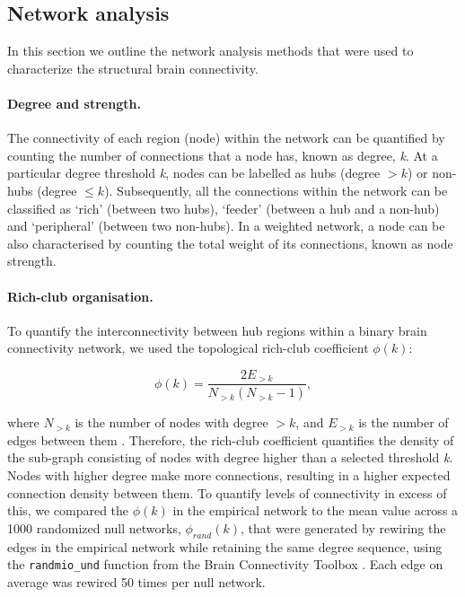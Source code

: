 \subsection{Network analysis}
In this section we outline the network analysis methods that were used to characterize the structural brain connectivity.

\paragraph*{Degree and strength.}

The connectivity of each region (node) within the network can be quantified by counting the number of connections that a node has, known as degree, \textit{k}. At a particular degree threshold \textit{k}, nodes can be labelled as hubs (degree $> k$) or non-hubs (degree $\leq k$). Subsequently, all the connections within the network can be classified as `rich' (between two hubs), `feeder' (between a hub and a non-hub) and `peripheral' (between two non-hubs). In a weighted network, a node can be also characterised by counting the total weight of its connections, known as node strength.

\paragraph*{Rich-club organisation.}

To quantify the interconnectivity between hub regions within a binary brain connectivity network, we used the topological rich-club coefficient $\phi(k)$:

\begin{equation}
    \label{eqn:Ch5Eq1}
    \phi(k) = \frac{2E_{>k}}{N_{>k}(N_{>k}-1)},
\end{equation}

where $N_{>k}$ is the number of nodes with degree $>k$, and $E_{>k}$ is the number of edges between them \citep{Colizza2006}. Therefore, the rich-club coefficient quantifies the density of the sub-graph consisting of nodes with degree higher than a selected threshold \textit{k}. Nodes with higher degree make more connections, resulting in a higher expected connection density between them. To quantify levels of connectivity in excess of this, we compared the $\phi(k)$ in the empirical network to the mean value across a 1000 randomized null networks, $\phi_{rand}(k)$, that were generated by rewiring the edges in the empirical network while retaining the same degree sequence, using the \texttt{randmio\_und} function from the Brain Connectivity Toolbox \citep{Rubinov2010}. Each edge on average was rewired 50 times per null network.

